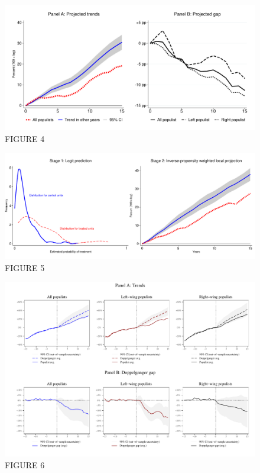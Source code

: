 \documentclass{article}
\begin{document}
\clearpage

\begin{figure}	
	\caption{FIGURE 4} 
		\includegraphics[scale=0.6]{Figure4}\centering	
\end{figure}

\clearpage

\begin{figure}	
	\caption{FIGURE 5} 
		\includegraphics[scale=0.6]{Figure5}\centering	
\end{figure}

\clearpage

\begin{figure}	
	\caption{FIGURE 6} 
		\includegraphics[scale=0.6]{Figure6}\centering	
\end{figure}
\end{document}
